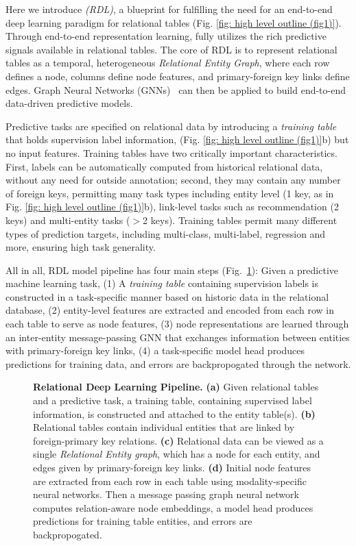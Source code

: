 Here we introduce \emph{\AreaName (RDL)}, a blueprint for fulfilling the need for an end-to-end deep learning paradigm for relational tables (Fig. \ref{fig: high level outline (fig1)}).
Through end-to-end representation learning, \AreaName fully utilizes the rich predictive signals available in relational tables. The core of RDL is to represent relational tables as a temporal, heterogeneous  {\em Relational Entity Graph}, where each row defines a node, columns define node features, and primary-foreign key links define edges. Graph Neural Networks (GNNs)~\citep{gilmer2017mpgnn, hamilton2017inductive} can then be applied to build end-to-end data-driven predictive models.



Predictive tasks are specified on relational data by introducing a {\em training table} that holds supervision label information, (Fig. \ref{fig: high level outline (fig1)}b) but no input features. 
Training tables have two critically important characteristics. First, labels can be automatically computed from historical relational data, without any need for outside annotation; second, they may contain any number of foreign keys, permitting many task types including entity level (1 key, as in Fig. \ref{fig: high level outline (fig1)}b), link-level tasks such as recommendation (2 keys) and multi-entity tasks ($>$2 keys). Training tables permit many different types of prediction targets, including multi-class, multi-label, regression and more, ensuring high task generality.

All in all, RDL model pipeline has four main steps (Fig.~\ref{fig: end to end pipeline}): Given a predictive machine learning task, (1)  A \emph{training table} containing supervision labels is constructed in a task-specific manner based on historic data in the relational database, (2) entity-level features are extracted and encoded from each row in each table to serve as node features, (3) node representations are learned through an inter-entity message-passing GNN that exchanges information between entities with primary-foreign key links, (4) a task-specific model head produces predictions for training data, and errors are backpropogated through the network. 

\begin{figure}[t] %
  \centering
  
  \caption{\textbf{Relational Deep Learning Pipeline.} \textbf{(a)} Given relational tables and a predictive task, a training table, containing supervised label information, is constructed and attached to the entity table(s). \textbf{(b)} Relational tables contain individual entities that are linked by foreign-primary key relations. \textbf{(c)} Relational data can be viewed as a single {\em Relational Entity graph}, which has a node for each entity, and edges given by primary-foreign key links. \textbf{(d)} Initial node features are extracted from each row in each table using modality-specific neural networks. Then a message passing graph neural network computes relation-aware node embeddings, a model head produces predictions for training table entities, and errors are backpropogated.
  }
  \label{fig: end to end pipeline}
\end{figure}

